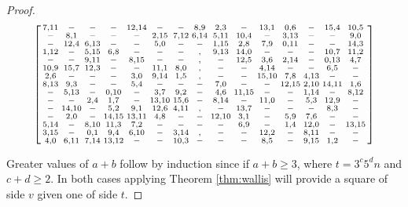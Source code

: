 \begin{proof}
\begin{equation}
  \begin{bsmallmatrix}
    7,11 &   -   &   -   &   -   & 12,14 &   -   &   -   &  8,9  &  2,3  &   -   & 13,1  &  0,6  &   -   & 15,4  & 10,5  \\ 
     -   &  8,1  &   -   &   -   &   -   &  2,15 &  7,12 &  6,14 &  5,11 & 10,4  &   -   &  3,13 &   -   &   -   &  9,0  \\ 
     -   & 12,4  &  6,13 &   -   &   -   &  5,0  &   -   &   -   &  1,15 &  2,8  &  7,9  &  0,11 &   -   &   -   & 14,3  \\ 
    1,12 &   -   &  5,15 &  6,8  &   -   &   -   &   -   &   ,   &  9,13 & 14,0  &   -   &   -   &   -   & 10,7  & 11,2  \\ 
     -   &   -   &  9,11 &   -   &  8,15 &   -   &   -   &   ,   &   -   & 12,5  &  3,6  &  2,14 &   -   &  0,13 &  4,7  \\ 
   10,9  & 15,7  & 12,3  &   -   &   -   & 11,1  &  8,0  &   ,   &   -   &   -   &  4,14 &   -   &   -   &  6,5  &   -   \\ 
    2,6  &   -   &   -   &   -   &  3,0  &  9,14 &  1,5  &   ,   &   -   &   -   & 15,10 &  7,8  &  4,13 &   -   &   -   \\ 
    8,13 &  9,3  &   -   &   -   &  5,4  &   -   &   -   &   -   &  7,0  &   -   &   -   & 12,15 &  2,10 & 14,11 &  1,6  \\ 
     -   &  5,13 &   -   &  0,10 &   -   &  3,7  &  9,2  &   -   &  4,6  & 11,15 &   -   &   -   &  1,14 &   -   &  8,12 \\ 
     -   &   -   &  2,4  &  1,7  &   -   & 13,10 & 15,6  &   -   &  8,14 &   -   & 11,0  &   -   &  5,3  & 12,9  &   -   \\ 
     -   & 14,10 &   -   &  5,2  &  9,1  & 12,6  &  4,11 &   ,   &   -   & 13,7  &   -   &   -   &   -   &  8,3  &   -   \\ 
     -   &  2,0  &   -   & 14,15 & 13,11 &  4,8  &   -   &   -   & 12,10 &  3,1  &   -   &  5,9  &  7,6  &   -   &   -   \\ 
    5,14 &   -   &  8,10 & 11,3  &  7,2  &   -   &   -   &   -   &   -   &  6,9  &   -   &  1,4  & 12,0  &   -   & 13,15 \\ 
    3,15 &   -   &  0,1  &  9,4  &  6,10 &   -   &  3,14 &   ,   &   -   &   -   & 12,2  &   -   &  8,11 &   -   &   -   \\ 
    4,0  &  6,11 &  7,14 & 13,12 &   -   &   -   & 10,3  &   -   &   -   &   -   &  8,5  &   -   &  9,15 &  1,2  &   -   \\ 
  \end{bsmallmatrix}
  \label{eq:order-sixteen}
\end{equation}

Greater values of $a + b$ follow by induction since if $a + b \geq 3$, where $t = 3^{c}5^{d}n$ and $c + d \geq 2$.
In both cases applying Theorem \ref{thm:wallis} will provide a square of side $v$ given one of side $t$.

\end{proof}
